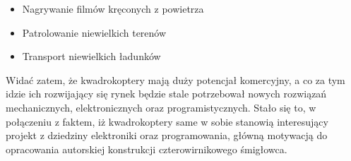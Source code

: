 \begin{itemize}
	\item Nagrywanie filmów kręconych z powietrza
	\item Patrolowanie niewielkich terenów
	\item Transport niewielkich ładunków
\end{itemize}
 
Widać zatem, że kwadrokoptery mają duży potencjał komercyjny, a co za tym idzie ich rozwijający się rynek będzie stale potrzebował nowych rozwiązań mechanicznych, elektronicznych oraz programistycznych. Stało się to, w połączeniu z faktem, iż kwadrokoptery same w sobie stanowią interesujący projekt z dziedziny elektroniki oraz programowania, główną motywacją do opracowania autorskiej konstrukcji czterowirnikowego śmigłowca.

 
